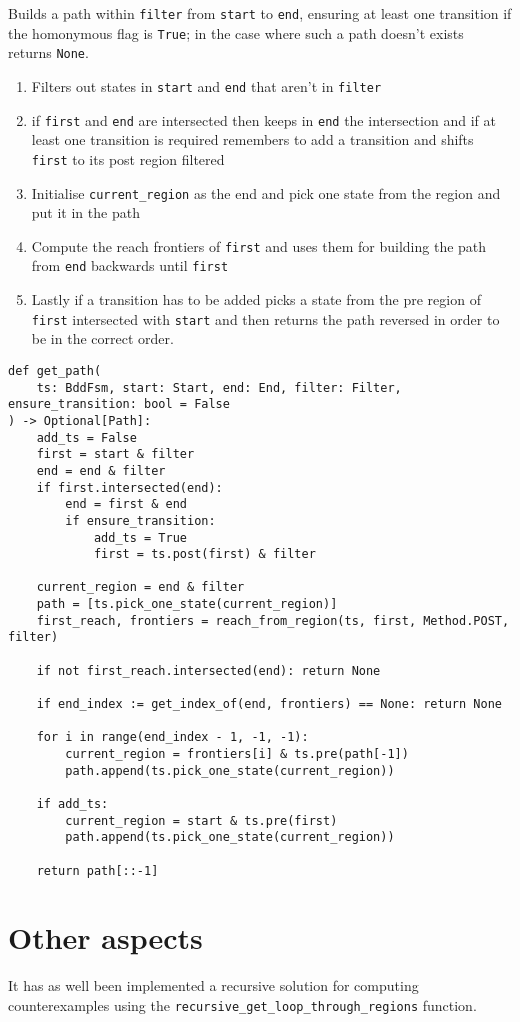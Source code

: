 \documentclass[11pt]{article}
\newcommand{\minline}[1]{{\footnotesize \texttt{#1}}}
\begin{document}
Builds a path within \minline{filter} from \minline{start} to \minline{end},
ensuring at least one transition if the homonymous flag is \minline{True};
in the case where such a path doesn't exists returns \minline{None}.
\begin{enumerate}
	\item Filters out states in \minline{start} and \minline{end} that aren't
	      in \minline{filter}
	\item if \minline{first} and \minline{end} are intersected then keeps in
	      \minline{end} the intersection and if at least one transition is
	      required remembers to add a transition and shifts \minline{first} to
	      its post region filtered
	\item Initialise \minline{current_region} as the end and pick one state
	      from the region and put it in the path
	\item Compute the reach frontiers of \minline{first} and uses them for
	      building the path from \minline{end} backwards until \minline{first}
	\item Lastly if a transition has to be added picks a state from the pre
	      region of \minline{first} intersected with \minline{start} and then
	      returns the path reversed in order to be in the correct order.
\end{enumerate}

\begin{verbatim}
def get_path(
    ts: BddFsm, start: Start, end: End, filter: Filter, ensure_transition: bool = False
) -> Optional[Path]:
    add_ts = False
    first = start & filter
    end = end & filter
    if first.intersected(end):
        end = first & end
        if ensure_transition:
            add_ts = True
            first = ts.post(first) & filter

    current_region = end & filter
    path = [ts.pick_one_state(current_region)]
    first_reach, frontiers = reach_from_region(ts, first, Method.POST, filter)

    if not first_reach.intersected(end): return None

    if end_index := get_index_of(end, frontiers) == None: return None

    for i in range(end_index - 1, -1, -1):
        current_region = frontiers[i] & ts.pre(path[-1])
        path.append(ts.pick_one_state(current_region))

    if add_ts:
        current_region = start & ts.pre(first)
        path.append(ts.pick_one_state(current_region))

    return path[::-1]
\end{verbatim}

\section{Other aspects}

It has as well been implemented a recursive solution for computing
counterexamples using the \minline{recursive_get_loop_through_regions}
function.
\end{document}
